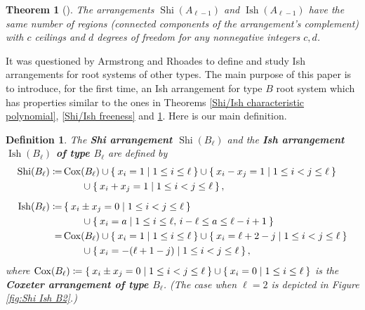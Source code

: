 \documentclass[11pt]{article}
\newtheorem{definition}[theo]{Definition}
\newtheorem{theorem}[theo]{Theorem}
\theoremstyle{definition}
\numberwithin{equation}{section}
\DeclareMathOperator{\Cox}{Cox}
\DeclareMathOperator{\Shi}{Shi}
\DeclareMathOperator{\Ish}{Ish}
\newcommand{\tbf}{\textbf}
\begin{document}
\begin{theorem}[\cite{AR12,LRW14}]\label{Shi/Ish chamber}
The arrangements $\Shi(A_{\ell-1})$ and $\Ish(A_{\ell-1})$ have the same number of regions (connected components of the arrangement's complement) with $c$ ceilings and $d$ degrees of freedom for any nonnegative integers $c,d$. 
\end{theorem}

It was questioned by Armstrong and Rhoades  \cite[\S5.3(6)]{AR12} to define and study Ish arrangements for root systems of other types. 
The main purpose of this paper is to introduce, for the first time, an Ish arrangement for  type $B$ root system which has  properties similar to the ones in Theorems \ref{Shi/Ish characteristic polynomial}, \ref{Shi/Ish freeness} and \ref{Shi/Ish chamber}. 
Here is our main definition. 

\begin{definition}
\label{def:Shi-Ish-B}
The \tbf{Shi arrangement $\Shi(B_\ell)$} and the \tbf{Ish arrangement $\Ish(B_\ell)$ of type $B_{\ell}$} are defined by 
\begin{equation*}
\label{eq:BSI}
\begin{aligned}
\Shi(B_\ell) \coloneqq&\Cox(B_\ell)  \cup  \Set{ x_{i} = 1 | 1 \leq i  \leq \ell } \cup  \Set{ x_{i}- x_{j}= 1 | 1 \leq i < j \leq \ell} \\ 
& \qquad\cup  \Set{x_{i}+x_{j}= 1 | 1 \leq i < j \leq \ell}, \\[2mm]
\Ish(B_\ell) \coloneqq& \Set{x_{i}\pm x_{j} = 0 | 1 \leq i < j \leq \ell} \\
& \qquad \cup \Set{x_{i} = a | 1 \leq i \leq \ell, \,i-\ell \leq a \leq \ell-i+1 }\\
=& \Cox(B_\ell)  \cup  \Set{ x_{i} = 1 |1 \leq i  \leq \ell} \cup  \Set{ x_{i} = \ell+2-j  | 1 \leq i < j \leq \ell}\\ 
& \qquad\cup  \Set{ x_{i} =  -(\ell+1-j )| 1 \leq i < j \leq \ell},
\end{aligned}
\end{equation*}
where $\Cox(B_\ell) \coloneqq \Set{ x_{i}\pm x_{j}=0 | 1 \leq i < j \leq \ell} \cup \Set{ x_{i} = 0 |  1 \leq i  \leq \ell} $ is the  \textbf{Coxeter arrangement of type $B_\ell$}. 
(The case when $\ell=2$ is depicted in Figure \ref{fig:Shi Ish B2}.)
\end{definition}
\end{document}
